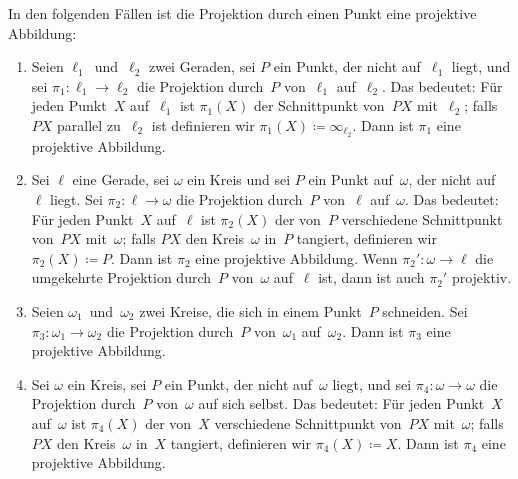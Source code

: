 \begin{satzmitnamen}[Lemma]
	In den folgenden Fällen ist die Projektion durch einen Punkt eine projektive Abbildung:
	\begin{enumerate}
		\item \label{itm:projAbb:GG}
		Seien $\ell_1$~und~$\ell_2$ zwei Geraden, sei $P$ ein Punkt, der nicht auf~$\ell_1$ liegt, und sei $\pi_1\colon \ell_1\to \ell_2$ die Projektion durch~$P$ von~$\ell_1$ auf~$\ell_2$. Das bedeutet: Für jeden Punkt~$X$ auf~$\ell_1$ ist $\pi_1(X)$ der Schnittpunkt von~$PX$ mit~$\ell_2$; falls $PX$ parallel zu~$\ell_2$ ist definieren wir $\pi_1(X)\coloneqq \infty_{\ell_2}$. Dann ist $\pi_1$ eine projektive Abbildung.
		\item \label{itm:projAbb:GK}
		Sei $\ell$ eine Gerade, sei $\omega$ ein Kreis und sei $P$ ein Punkt auf~$\omega$, der nicht auf~$\ell$ liegt.
		Sei $\pi_2\colon \ell\to \omega$ die Projektion durch~$P$ von~$\ell$ auf~$\omega$. Das bedeutet: Für jeden Punkt~$X$ auf~$\ell$ ist $\pi_2(X)$ der von~$P$ verschiedene Schnittpunkt von~$PX$ mit~$\omega$; falls $PX$ den Kreis~$\omega$ in~$P$ tangiert, definieren wir $\pi_2(X)\coloneqq P$.
		Dann ist $\pi_2$ eine projektive Abbildung. Wenn $\pi_2'\colon\omega\to \ell$ die umgekehrte Projektion durch~$P$ von~$\omega$ auf~$\ell$ ist, dann ist auch $\pi_2'$ projektiv.
		\item \label{itm:projAbb:KK}
		Seien $\omega_1$~und~$\omega_2$ zwei Kreise, die sich in einem Punkt~$P$ schneiden. Sei $\pi_3\colon \omega_1\to \omega_2$ die Projektion durch~$P$ von~$\omega_1$ auf~$\omega_2$. Dann ist $\pi_3$ eine projektive Abbildung.
		\item \label{itm:projAbb:K}
		Sei $\omega$ ein Kreis, sei $P$ ein Punkt, der nicht auf~$\omega$ liegt, und sei $\pi_4\colon \omega\to \omega$ die Projektion durch~$P$ von~$\omega$ auf sich selbst. Das bedeutet: Für jeden Punkt~$X$ auf~$\omega$ ist $\pi_4(X)$ der von~$X$ verschiedene Schnittpunkt von~$PX$ mit~$\omega$; falls $PX$ den Kreis~$\omega$ in~$X$ tangiert, definieren wir $\pi_4(X)\coloneqq X$. Dann ist $\pi_4$ eine projektive Abbildung.
	\end{enumerate}
\end{satzmitnamen}

